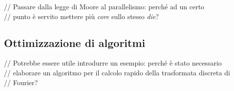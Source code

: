 // Passare dalla legge di Moore al parallelismo: perché ad un certo \\
// punto è servito mettere più \emph{core} sullo stesso \emph{die}?


\subsection{Ottimizzazione di algoritmi}

// Potrebbe essere utile introdurre un esempio: perché è stato necessario \\
// elaborare un algoritmo per il calcolo rapido della trasformata discreta di \\
// Fourier?
